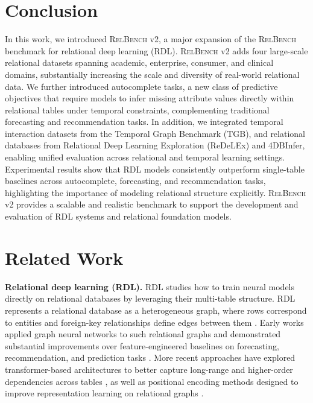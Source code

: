 \documentclass{article} %
\newcommand{\relbench}{\textsc{RelBench}\xspace}
\begin{document}
\section{Conclusion}
In this work, we introduced \relbench v2, a major expansion of the \relbench benchmark for relational deep learning (RDL). \relbench v2 adds four large-scale relational datasets spanning academic, enterprise, consumer, and clinical domains, substantially increasing the scale and diversity of real-world relational data. We further introduced autocomplete tasks, a new class of predictive objectives that require models to infer missing attribute values directly within relational tables under temporal constraints, complementing traditional forecasting and recommendation tasks. In addition, we integrated temporal interaction datasets from the Temporal Graph Benchmark (TGB), and relational databases from Relational Deep Learning Exploration (ReDeLEx) and 4DBInfer, enabling unified evaluation across relational and temporal learning settings. Experimental results show that RDL models consistently outperform single-table baselines across autocomplete, forecasting, and recommendation tasks, highlighting the importance of modeling relational structure explicitly. \relbench v2 provides a scalable and realistic benchmark to support the development and evaluation of RDL systems and relational foundation models.





\newpage
\appendix
\section{Related Work} \label{sec:related-work}

\textbf{Relational deep learning (RDL).} RDL studies how to train neural models directly on relational databases by leveraging their multi-table structure. RDL represents a relational database as a heterogeneous graph, where rows correspond to entities and foreign-key relationships define edges between them \citep{rdl}. Early works applied graph neural networks to such relational graphs and demonstrated substantial improvements over feature-engineered baselines on forecasting, recommendation, and prediction tasks \citep{relbench, chen2025relgnn}. More recent approaches have explored transformer-based architectures to better capture long-range and higher-order dependencies across tables \citep{dbformer, dwivedi2025relational}, as well as positional encoding methods designed to improve representation learning on relational graphs \citep{kanatsoulis2025learningefficientpositionalencodings}.
\end{document}

